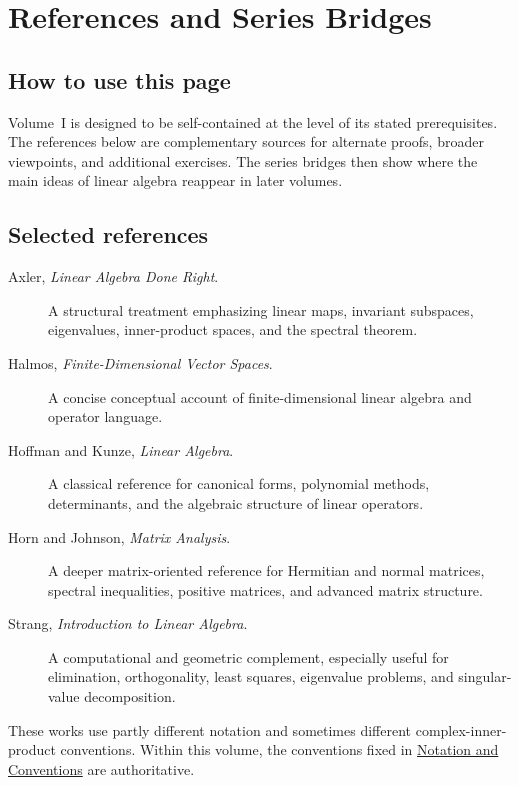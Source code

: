 \chapter*{References and Series Bridges}
\label{sec:i-references-and-series-bridges}

\section*{How to use this page}

Volume~I is designed to be self-contained at the level of its stated
prerequisites. The references below are complementary sources for alternate
proofs, broader viewpoints, and additional exercises. The series bridges then
show where the main ideas of linear algebra reappear in later volumes.

\section*{Selected references}

\begin{description}
\item[Axler, \emph{Linear Algebra Done Right}.]
A structural treatment emphasizing linear maps, invariant subspaces,
eigenvalues, inner-product spaces, and the spectral theorem.

\item[Halmos, \emph{Finite-Dimensional Vector Spaces}.]
A concise conceptual account of finite-dimensional linear algebra and operator
language.

\item[Hoffman and Kunze, \emph{Linear Algebra}.]
A classical reference for canonical forms, polynomial methods, determinants,
and the algebraic structure of linear operators.

\item[Horn and Johnson, \emph{Matrix Analysis}.]
A deeper matrix-oriented reference for Hermitian and normal matrices,
spectral inequalities, positive matrices, and advanced matrix structure.

\item[Strang, \emph{Introduction to Linear Algebra}.]
A computational and geometric complement, especially useful for elimination,
orthogonality, least squares, eigenvalue problems, and singular-value
decomposition.
\end{description}

These works use partly different notation and sometimes different
complex-inner-product conventions. Within this volume, the conventions fixed in
\hyperref[sec:i-notation-and-conventions]{Notation and Conventions} are
authoritative.


